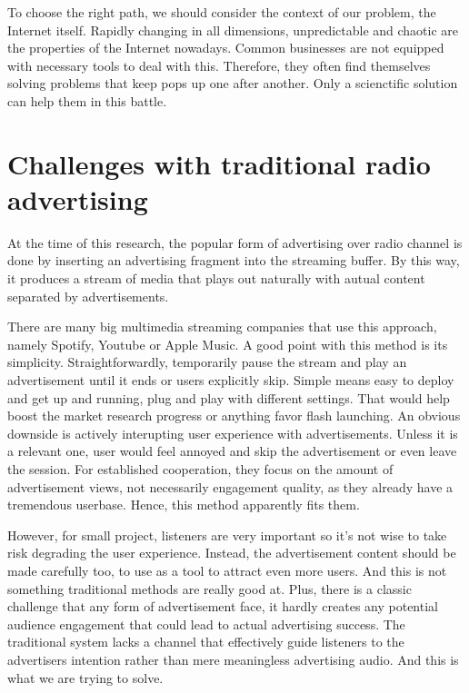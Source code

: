 To choose the right path, we should consider the context of our problem, the Internet itself. Rapidly changing in all dimensions, unpredictable and chaotic are the properties of the Internet nowadays. Common businesses are not equipped with necessary tools to deal with this. Therefore, they often find themselves solving problems that keep pops up one after another. Only a scienctific solution can help them in this battle.

\section{Challenges	with traditional radio advertising}

At the time of this research, the popular form of advertising over radio channel is done by inserting an advertising fragment into the streaming buffer. By this way, it produces a stream of media that plays out naturally with autual content separated by advertisements. 

There are many big multimedia streaming companies that use this approach, namely Spotify, Youtube or Apple Music. A good point with this method is its simplicity. Straightforwardly, temporarily pause the stream and play an advertisement until it ends or users explicitly skip. Simple means easy to deploy and get up and running, plug and play with different settings. That would help boost the market research progress or anything favor flash launching. An obvious downside is actively interupting user experience with advertisements. Unless it is a relevant one, user would feel annoyed and skip the advertisement or even leave the session. For established cooperation, they focus on the amount of advertisement views, not necessarily engagement quality, as they already have a tremendous userbase. Hence, this method apparently fits them.

However, for small project, listeners are very important so it's not wise to take risk degrading the user experience. Instead, the advertisement content should be made carefully too, to use as a tool to attract even more users. And this is not something traditional methods are really good at. Plus, there is a classic challenge that any form of advertisement face, it hardly creates any potential audience engagement that could lead to actual advertising success. The traditional system lacks a channel that effectively guide listeners to the advertisers intention rather than mere meaningless advertising audio. And this is what we are trying to solve.

